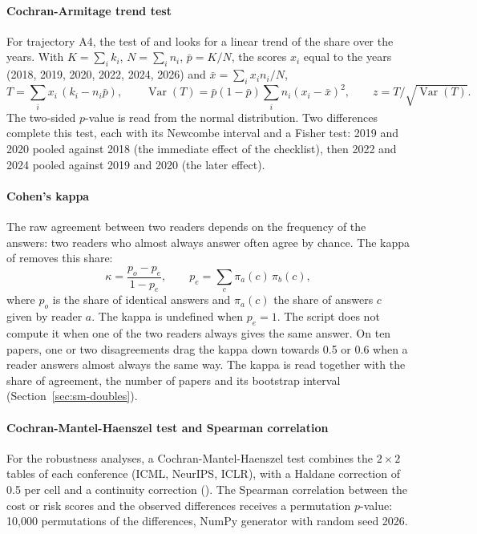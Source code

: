 \paragraph{Cochran-Armitage trend test}
For trajectory A4, the test of \textcite{cochran1954some} and \textcite{armitage1955tests} looks for a
linear trend of the share over the years. With $K = \sum_i k_i$, $N = \sum_i n_i$, $\bar{p} = K / N$,
the scores $x_i$ equal to the years (2018, 2019, 2020, 2022, 2024, 2026) and
$\bar{x} = \sum_i x_i n_i / N$,
\begin{equation}
  T = \sum_i x_i\,(k_i - n_i \bar{p}),
  \qquad
  \operatorname{Var}(T) = \bar{p}(1 - \bar{p}) \sum_i n_i (x_i - \bar{x})^2,
  \qquad
  z = T / \sqrt{\operatorname{Var}(T)}.
\end{equation}
The two-sided $p$-value is read from the normal distribution. Two differences complete this test, each
with its Newcombe interval and a Fisher test: 2019 and 2020 pooled against 2018 (the immediate effect of the checklist), then 2022
and 2024 pooled against 2019 and 2020 (the later effect).

\paragraph{Cohen's kappa}
The raw agreement between two readers depends on the frequency of the answers: two readers who almost
always answer  often agree by chance. The kappa of \textcite{cohen1960coefficient} removes this
share:
\begin{equation}
  \kappa = \frac{p_o - p_e}{1 - p_e},
  \qquad
  p_e = \sum_c \pi_a(c)\, \pi_b(c),
\end{equation}
where $p_o$ is the share of identical answers and $\pi_a(c)$ the share of answers $c$ given by reader
$a$. The kappa is undefined when $p_e = 1$. The script  does not compute it when one
of the two readers always gives the same answer. On ten papers, one or two disagreements drag the kappa
down towards 0.5 or 0.6 when a reader answers almost always the same way. The kappa is read
together with the share of agreement, the number of papers and its bootstrap interval
(Section~\ref{sec:sm-doubles}).

\paragraph{Cochran-Mantel-Haenszel test and Spearman correlation}
For the robustness analyses, a Cochran-Mantel-Haenszel test \parencite{mantel1959statistical} combines
the $2 \times 2$ tables of each conference (ICML, NeurIPS, ICLR), with a Haldane correction of 0.5 per
cell and a continuity correction (). The
Spearman correlation between the cost or risk scores and the observed differences receives a permutation
$p$-value: 10,000 permutations of the differences, NumPy generator with random seed 2026.

